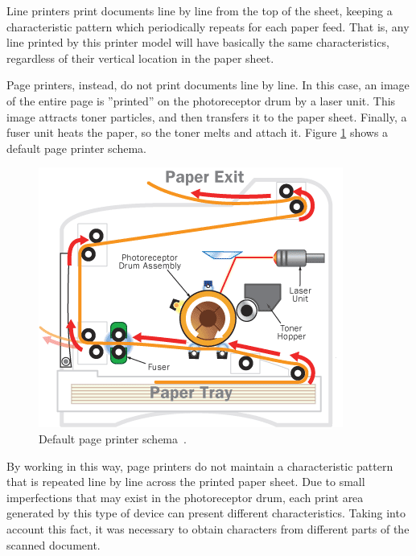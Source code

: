 \documentclass[10pt,twocolumn,letterpaper]{article}
\begin{document}
Line printers print documents line by line from the top of the sheet, keeping a characteristic pattern which periodically repeats for each paper feed. That is, any line printed by this printer model will have basically the same characteristics, regardless of their vertical location in the paper sheet. 

Page printers, instead, do not print documents line by line. In this case, an image of the entire page is ''printed'' on the photoreceptor drum by a laser unit. This image attracts toner particles, and then transfers it to the paper sheet. Finally, a fuser unit heats the paper, so the toner melts and attach it. Figure \ref{fig:page_printer} shows a default page printer schema.

\begin{figure}
\begin{center}
	\includegraphics[width=0.99\columnwidth]{page_printer}
	\caption{Default page printer schema~\cite{Document_Analysis}.}
\label{fig:page_printer}   
\end{center} 
\end{figure}

By working in this way, page printers do not maintain a characteristic pattern that is repeated line by line across the printed paper sheet. Due to small imperfections that may exist in the photoreceptor drum, each print area generated by this type of device can present different characteristics.
Taking into account this fact, it was necessary to obtain characters from different parts of the scanned document. 
\end{document}
